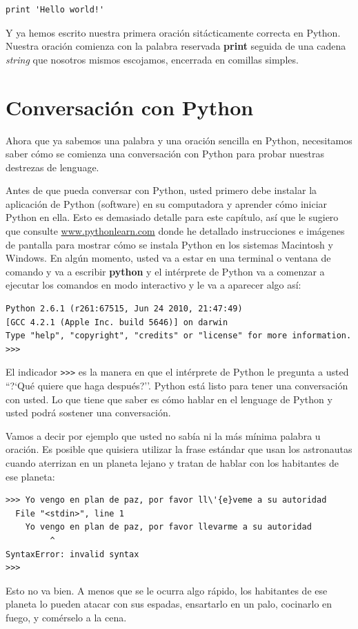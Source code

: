 \beforeverb
\begin{verbatim}
print 'Hello world!'
\end{verbatim}
\afterverb

Y ya hemos escrito nuestra primera oraci\'on sit\'acticamente correcta en Python.
Nuestra oraci\'on comienza con la palabra reservada {\bf print} seguida de una cadena \textit{string} que nosotros mismos escojamos, encerrada en comillas simples.

\section{Conversaci\'on con Python}

Ahora que ya sabemos una palabra y una oraci\'on sencilla  en Python,
necesitamos saber c\'omo se comienza una conversaci\'on con Python para probar 
nuestras destrezas de lenguage.

Antes de que pueda conversar con Python, usted primero debe instalar la aplicaci\'on de Python
(software) en su computadora y aprender c\'omo iniciar Python en ella. Esto es demasiado detalle para este cap\'itulo, as\'i que le sugiero que consulte \url{www.pythonlearn.com} donde he detallado instrucciones e im\'agenes de pantalla para mostrar c\'omo se instala Python 
en los sistemas Macintosh y Windows. En alg\'un momento, usted va a estar en 
una terminal o ventana de comando y va a escribir {\bf python} y el int\'erprete 
de Python va a comenzar a ejecutar los comandos en modo interactivo 
y le va a aparecer algo as\'i:

\beforeverb
\begin{verbatim}
Python 2.6.1 (r261:67515, Jun 24 2010, 21:47:49) 
[GCC 4.2.1 (Apple Inc. build 5646)] on darwin
Type "help", "copyright", "credits" or "license" for more information.
>>> 
\end{verbatim}
\afterverb
%
El indicador {\tt >>>} es la manera en que el int\'erprete de Python le pregunta a usted ``?`Qu\'e quiere que haga despu\'es?''. Python est\'a listo para tener una conversaci\'on con usted. Lo que tiene que saber es c\'omo hablar en el lenguage de Python y usted podr\'a sostener una conversaci\'on.

Vamos a decir por ejemplo que usted no sab\'ia ni la m\'as m\'inima palabra u oraci\'on. Es posible que quisiera utilizar la frase est\'andar que usan los astronautas cuando aterrizan en un planeta lejano y tratan de hablar con los habitantes de ese planeta:

\beforeverb
\begin{verbatim}
>>> Yo vengo en plan de paz, por favor ll\'{e}veme a su autoridad 
  File "<stdin>", line 1
    Yo vengo en plan de paz, por favor llevarme a su autoridad
         ^
SyntaxError: invalid syntax
>>> 
\end{verbatim}
\afterverb
%
Esto no va bien. A menos que se le ocurra algo r\'apido, los habitantes de ese planeta lo pueden atacar con sus espadas, ensartarlo en un palo, cocinarlo en fuego, y com\'erselo a la cena.

